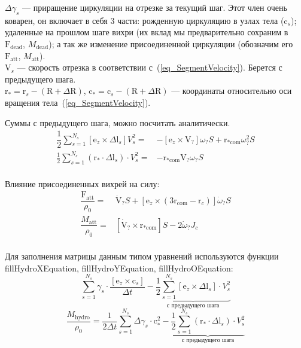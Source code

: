 \documentclass[14pt]{extreport}
\newcommand{\br}[1]{\boldsymbol{\mathrm{#1}}}
\renewcommand{\vec}[1]{\br{#1}}
\newcommand{\att}{\text{att}}
\begin{document}
$\Delta \gamma_s$ --- приращение циркуляции на отрезке за текущий шаг. Этот член очень коварен, он включает в себя 3 части: рожденную циркуляцию в узлах тела ($\vec c_s$); удаленные на прошлом шаге вихри (их вклад мы предварительно сохраним в $\vec F_\text{dead}$, $M_\text{dead}$); а так же изменение присоединенной циркуляции (обозначим его $\vec F_\att$, $M_\att$).\\
$\vec V_s$ --- скорость отрезка в соответствии с~(\ref{eq_SegmentVelocity}). Берется с предыдущего шага.\\
$\vec r_* = \vec r_s - (\vec R + \Delta \vec R)$, $\vec c_* = \vec c_s - (\vec R + \Delta \vec R)$ --- координаты относительно оси вращения тела~(\ref{eq_SegmentVelocity}).

Суммы с предыдущего шага, можно посчитать аналитически.
\begin{equation*}
\begin{split}
\dfrac{1}{2} \sum_{s=1}^{N_s} [\vec e_z \times \Delta \vec l_s] V_s^2
=& - [\vec e_z \times \vec V_?]\omega_? S + \vec r_{*\text{com}} \omega_?^2 S \\
\frac{1}{2} \sum_{s=1}^{N_s} (\vec r_* \cdot \Delta \vec l_s) \cdot V_s^2
=& - \vec r_{*\text{com}} \vec V_? \omega_? S \\
\end{split}
\end{equation*}

Влияние присоединенных вихрей на силу:
\begin{equation*}
\begin{split}
\dfrac{\vec F_\att}{\rho_0} =& \dot{\vec{V}}_? S + [\vec e_z \times (3 \vec r_\text{com} - \vec r_c)] \dot{\omega}_? S \\
\dfrac{M_\att}{\rho_0} =& [\dot{\vec{V}}_? \times \vec r_{*\text{com}}] S - 2 \dot{\omega}_? J_c \\
\end{split}
\end{equation*}

Для заполнения матрицы данным типом уравнений используются функции fillHydroXEquation, fillHydroYEquation, fillHydroOEquation:
\begin{equation}
\label{eq_force}
\sum\limits_{s=1}^{N_s} {\gamma_s \cdot \frac{[\vec e_z \times \vec c_s]}{\Delta t}} -
\underbrace {
	\frac{1}{2} \sum\limits_{s=1}^{N_s}
		[\vec e_z \times \Delta \vec l_s] \cdot V_s^2
}_{\text{с предыдущего шага}}
\end{equation}
%
\begin{equation}
\label{eq_moment}
\dfrac{M_\text{hydro}}{\rho_0} =
\frac{1}{2\Delta t}\sum\limits_{s=1}^{N_s} { \Delta \gamma_s \cdot \vec c_*^2 }
-
\underbrace {
	\frac{1}{2} \sum\limits_{s=1}^{N_s}
		(\vec r_* \cdot \Delta \vec l_s) \cdot V_s^2
}_{\text{с предыдущего шага}}
\end{equation}
\end{document}
